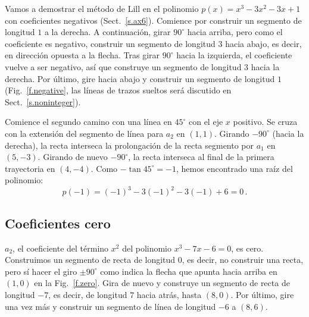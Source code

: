 Vamos a demostrar el método de Lill en el polinomio $p(x)=x^3-3x^2-3x+1$ con coeficientes negativos (Sect.~\ref{s.ax6}). Comience por construir un segmento de longitud $1$ a la derecha. A continuación, girar $90^\circ$ hacia arriba, pero como el coeficiente es negativo, construir un segmento de longitud $3$ hacia abajo, es decir, en dirección opuesta a la flecha. Tras girar $90^\circ$ hacia la izquierda, el coeficiente vuelve a ser negativo, así que construye un segmento de longitud $3$ hacia la derecha. Por último, gire hacia abajo y construir un segmento de longitud $ 1 $ (Fig.~\ref{f.negative}, las líneas de trazos sueltos será discutido en Sect.~\ref{s.noninteger}).

Comience el segundo camino con una línea en $ 45^\circ$ con el eje $x$ positivo. Se cruza con la extensión del segmento de línea para $a_2$ en $(1,1)$. Girando $-90^\circ$ (hacia la derecha), la recta interseca la prolongación de la recta segmento por $a_1$ en $(5,-3)$. Girando de nuevo $-90^\circ$, la recta interseca al final de la primera trayectoria en $(4,-4)$. Como $-\tan 45^\circ=-1$, hemos encontrado una raíz del polinomio:
\[p(-1)=(-1)^3-3(-1)^2-3(-1)+6=0\,.\]


\subsection{Coeficientes cero}\label{s.zero}
$a_2$, el coeficiente del término $x^2$ del polinomio $x^3-7x-6=0$, es cero. Construimos un segmento de recta de longitud $0$, es decir, no construir una recta, pero sí hacer el giro $\pm 90^\circ$ como indica la flecha que apunta hacia arriba en $(1,0)$ en la Fig.~\ref{f.zero}. Gira de nuevo y construye un segmento de recta de longitud $-7$, es decir, de longitud $7$ hacia atrás, hasta $(8,0)$. Por último, gire una vez más y construir un segmento de línea de longitud $-6 $ a $(8,6)$.

